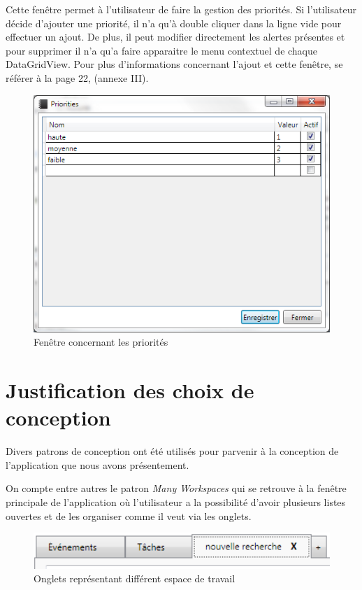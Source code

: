 \documentclass[letterpaper, oneside, 12pt, these, creativecommons]{thETS}
\begin{document}
Cette fenêtre permet à l'utilisateur de faire la gestion des priorités.  Si l'utilisateur décide d'ajouter une priorité, il n'a qu'à double cliquer dans la ligne vide pour effectuer un ajout. De plus, il peut modifier directement les alertes présentes et pour supprimer il n'a qu'a faire apparaitre le menu contextuel de chaque DataGridView. Pour plus d'informations concernant l'ajout et cette fenêtre, se référer à la page 22, (annexe III).

\begin{figure}[H!]
	\centering
	\includegraphics[width=1\textwidth]{fenetre_priorite.png}
	\caption{Fenêtre concernant les priorités}
\end{figure}

\newpage

\section{Justification des choix de conception}

Divers patrons de conception ont été utilisés pour parvenir à la conception de l'application que nous avons présentement. 

On compte entre autres le patron \emph{Many Workspaces} qui se retrouve à la fenêtre principale de l'application où l'utilisateur a la possibilité d'avoir plusieurs listes ouvertes et de les organiser comme il veut via les onglets.

\begin{figure}[H!]
	\centering
	\includegraphics[width=1\textwidth]{many_workspaces.png}
	\caption{Onglets représentant différent espace de travail}
\end{figure}
\end{document}
